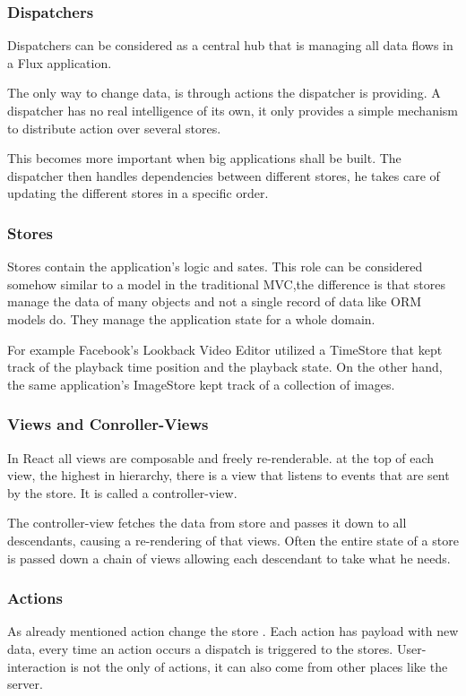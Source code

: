 \subsubsection{Dispatchers}
Dispatchers can be considered as a central hub that is managing all data flows in a Flux application.

The only way to change data, is through actions the dispatcher is providing.
A dispatcher has no real intelligence of its own, it only provides a simple mechanism to distribute action over several stores.

This becomes more important when big applications shall be built. The dispatcher then handles dependencies between different stores, he takes care of updating the different stores in a specific order.

\subsubsection{Stores}
Stores contain the application's logic and sates. This role can be considered somehow similar to a model in the traditional MVC,the difference is that stores manage the data of many objects and not a single record of data like ORM models do. They manage the application state for a whole domain. 

For example Facebook's Lookback Video Editor utilized a TimeStore that kept track of the playback time position and the playback state. On the other hand, the same application's ImageStore kept track of a collection of images.

\subsubsection{Views and Conroller-Views}

In React all views are composable and freely re-renderable. at the top of each view, the highest in hierarchy, there is a view that listens to events that are sent by the store. It is called a controller-view. 

The controller-view fetches the data from store and passes it down to all descendants, causing a re-rendering of that views. Often the entire state of a store is passed down a chain of views allowing each descendant to take what he needs.

\subsubsection{Actions}
As already mentioned action change the store . Each action has payload with new data, every time an action occurs a dispatch is triggered to the stores.
User-interaction is not the only of actions, it can also come from other places like the server.


